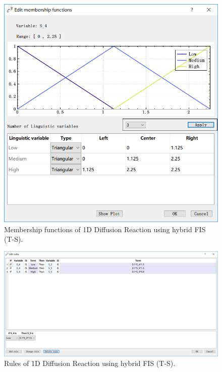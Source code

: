 \documentclass[journal,a4paper,onecolumn]{article}
\begin{document}
\begin{figure}[!hbt]
	\begin{center}
		\includegraphics[width=0.9\columnwidth]{fig39}
		\caption{Membership functions of 1D Diffusion Reaction using hybrid FIS (T-S).}
		\label{fig:Membership functions of 1D Diffusion Reaction using hybrid FIS (T-S).}
	\end{center}
\end{figure}
\begin{figure}[!hbt]
	\begin{center}
		\includegraphics[width=\columnwidth]{fig40}
		\caption{Rules of 1D Diffusion Reaction using hybrid FIS (T-S).}
		\label{fig:Rules of 1D Diffusion Reaction using hybrid FIS (T-S).}
	\end{center}
\end{figure}
\clearpage
\end{document}
